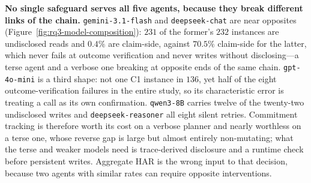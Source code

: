 \textbf{No single safeguard serves all five agents, because they break
different links of the chain.} \texttt{gemini-3.1-flash} and
\texttt{deepseek-chat} are near opposites
(Figure~\ref{fig:rq3-model-composition}): $231$ of the former's $232$ instances
are undisclosed reads and $0.4\%$ are claim-side, against $70.5\%$ claim-side
for the latter, which never fails at outcome verification and never writes
without disclosing---a terse agent and a verbose one breaking at opposite ends
of the same chain. \texttt{gpt-4o-mini} is a third shape: not one C1 instance
in $136$, yet half of the eight outcome-verification failures in the entire
study, so its characteristic error is treating a call as its own confirmation.
\texttt{qwen3-8B} carries twelve of the twenty-two undisclosed writes and
\texttt{deepseek-reasoner} all eight silent retries. Commitment tracking is
therefore worth its cost on a verbose planner and nearly worthless on a terse
one, whose reverse gap is large but almost entirely non-mutating; what the
terse and weaker models need is trace-derived disclosure and a runtime check
before persistent writes. Aggregate HAR is the wrong input to that decision,
because two agents with similar rates can require opposite interventions.

